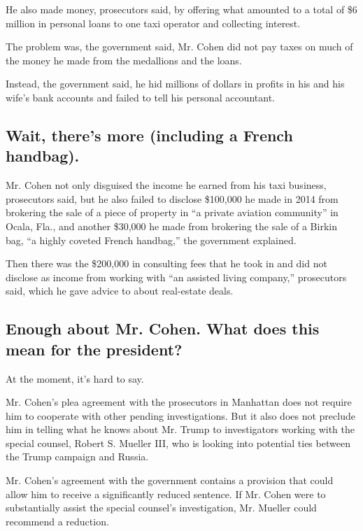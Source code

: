 He also made money, prosecutors said, by offering what amounted to a
total of \$6 million in personal loans to one taxi operator and
collecting interest.

The problem was, the government said, Mr. Cohen did not pay taxes on
much of the money he made from the medallions and the loans.

Instead, the government said, he hid millions of dollars in profits in
his and his wife's bank accounts and failed to tell his personal
accountant.

\hypertarget{wait-theres-more-including-a-french-handbag}{%
\subsection{Wait, there's more (including a French
handbag).}\label{wait-theres-more-including-a-french-handbag}}

Mr. Cohen not only disguised the income he earned from his taxi
business, prosecutors said, but he also failed to disclose \$100,000 he
made in 2014 from brokering the sale of a piece of property in ``a
private aviation community'' in Ocala, Fla., and another \$30,000 he
made from brokering the sale of a Birkin bag, ``a highly coveted French
handbag,'' the government explained.

Then there was the \$200,000 in consulting fees that he took in and did
not disclose as income from working with ``an assisted living company,''
prosecutors said, which he gave advice to about real-estate deals.

\hypertarget{enough-about-mr-cohen-what-does-this-mean-for-the-president}{%
\subsection{Enough about Mr. Cohen. What does this mean for the
president?}\label{enough-about-mr-cohen-what-does-this-mean-for-the-president}}

At the moment, it's hard to say.

Mr. Cohen's plea agreement with the prosecutors in Manhattan does not
require him to cooperate with other pending investigations. But it also
does not preclude him in telling what he knows about Mr. Trump to
investigators working with the special counsel, Robert S. Mueller III,
who is looking into potential ties between the Trump campaign and
Russia.

Mr. Cohen's agreement with the government contains a provision that
could allow him to receive a significantly reduced sentence. If Mr.
Cohen were to substantially assist the special counsel's investigation,
Mr. Mueller could recommend a reduction.

